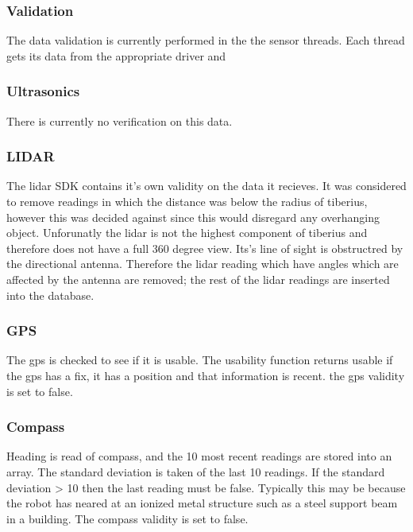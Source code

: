 \subsubsection{Validation}
The data validation is currently performed in the the sensor threads. Each thread gets its data from the appropriate driver and 

\subsubsection{Ultrasonics}
There is currently no verification on this data.

\subsubsection{LIDAR}
The lidar SDK contains it's own validity on the data it recieves. It was considered to remove readings in which the distance was below the radius of tiberius, however this was decided against since this would disregard any overhanging object. 
\newline
Unforunatly the lidar is not the highest component of tiberius and therefore does not have a full 360 degree view. Its's line of sight is obstructred by the directional antenna. Therefore the lidar reading which have angles which are affected by the antenna are removed; the rest of the lidar readings are inserted into the database. 

\subsubsection{GPS}
The gps is checked to see if it is usable. 
The usability function returns usable  if the gps has a fix, it has a position and that information is recent. 
the gps validity is set to false.

\subsubsection{Compass}
Heading is read of compass, and the 10 most recent readings are stored into an array. 
The standard deviation is taken of the last 10 readings. 
If the standard deviation > 10 then the last reading must be false. Typically this may be because the robot has neared at an ionized metal structure such as a steel support beam in a building. 
The compass validity is set to false.




